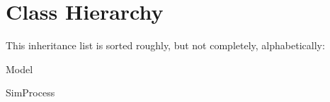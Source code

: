\section{Class Hierarchy}
This inheritance list is sorted roughly, but not completely, alphabetically\-:\begin{DoxyCompactList}
\item Model\begin{DoxyCompactList}
\item {}
\end{DoxyCompactList}
\item {}
\item Sim\-Process\begin{DoxyCompactList}
\item {}
\item {}
\end{DoxyCompactList}
\end{DoxyCompactList}
